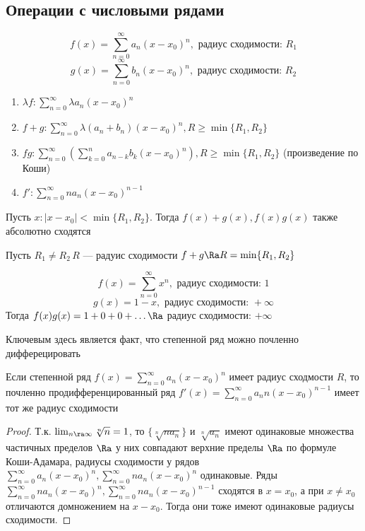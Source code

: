 
\subsection{Операции с числовыми рядами}
\[f(x) = \sum_{n = 0}^\infty a_n(x - x_0)^n, \text{ радиус сходимости: }R_1\]
\[g(x) = \sum_{n = 0}^\infty b_n(x - x_0)^n, \text{ радиус сходимости: }R_2\]
\begin{enumerate}
    \item \(\lambda f: \sum_{n = 0}^\infty \lambda a_n(x - x_0)^n\)
    \item \(f + g: \sum_{n = 0}^\infty \lambda (a_n + b_n)(x - x_0)^n, R \ge \min\{R_1, R_2\}\)
    \item \(fg: \sum_{n = 0}^\infty\left(\sum_{k = 0}^n a_{n - k}b_k(x - x_0)^n\right), R \ge \min\{R_1, R_2\}\) (произведение по Коши)
    \item \(f': \sum_{n = 0}^\infty na_n(x - x_0)^{n - 1}\)
\end{enumerate}

\begin{note}
    Пусть \(x: |x - x_0| < \min\{R_1, R_2\}\). Тогда \(f(x) + g(x), f(x)g(x)\) также абсолютно сходятся
\end{note}
\begin{note}
    Пусть \(R_1 \ne R_2\, R\) --- радуис сходимости \(f + g \Ra R = \min\{R_1, R_2\}\)
\end{note}
\begin{note}
    \[f(x) = \sum_{n = 0}^\infty x^n, \text{ радиус сходимости: }1\]
    \[g(x) = 1 - x, \text{ радиус сходимости: }+\infty\]
    Тогда \(f(x)g(x) = 1 + 0 + 0 + \dots \Ra\) радиус сходимости: \(+\infty\)
\end{note}
Ключевым здесь является факт, что степенной ряд можно почленно дифферецировать
\begin{lemma}
    Если степенной ряд \(f(x) = \sum_{n = 0}^\infty a_n(x - x_0)^n\) имеет радиус сходмости \(R\), то почленно продифференцированный ряд \(f'(x) = \sum_{n = 0}^\infty a_nn(x - x_0)^{n - 1}\) имеет тот же радиус сходимости
\end{lemma}
\begin{proof}
    Т.к. \(\lim_{n \ra \infty}\sqrt[n]{n} = 1\), то \(\{\sqrt[n]{na_n}\}\) и \(\sqrt[n]{a_n}\) имеют одинаковые множества частичных пределов \(\Ra\) у них совпадают верхние пределы \(\Ra\) по формуле Коши-Адамара, радиусы сходимости у рядов \(\sum_{n = 0}^\infty a_n(x - x_0)^n, \sum_{n = 0}^\infty na_n(x - x_0)^n\) одинаковые. Ряды \(\sum_{n = 0}^\infty na_n(x - x_0)^n, \sum_{n = 0}^\infty na_n(x - x_0)^{n - 1}\) сходятся в \(x = x_0\), а при \(x \ne x_0\) отличаются домножением на \(x - x_0\). Тогда они тоже имеют одинаковые радиусы сходимости.
\end{proof}

